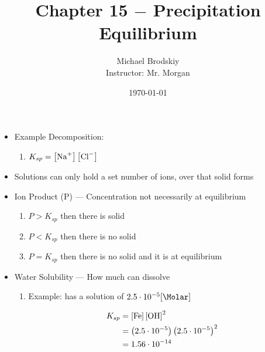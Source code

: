 \documentclass[12pt]{article}
\title{Chapter 15 $-$ Precipitation Equilibrium}
\date{\today}
\author{Michael Brodskiy\\ \small Instructor: Mr. Morgan}
\begin{document}
\maketitle

\begin{itemize}

  \item Example Decomposition: 

    \begin{enumerate}

      \item $K_{sp}=\left[ \ce{Na+} \right]\left[ \ce{Cl-} \right]$

    \end{enumerate}

  \item Solutions can only hold a set number of ions, over that solid forms

  \item Ion Product (P) — Concentration not necessarily at equilibrium

    \begin{enumerate}

      \item $P > K_{sp}$ then there is solid

      \item $P < K_{sp}$ then there is no solid

      \item $P = K_{sp}$ then there is no solid and it is at equilibrium

    \end{enumerate}

  \item Water Solubility — How much can dissolve

    \begin{enumerate}

      \item Example:  has a solution of $2.5\cdot10^{-5}[\si{\Molar}]$

        \begin{equation*}
          \begin{split}
            K_{sp}&=\left[ \ce{Fe} \right]\left[ \ce{OH} \right]^2\\
            &=\left( 2.5\cdot10^{-5} \right)\left( 2.5\cdot10^{-5} \right)^2\\
            &= 1.56\cdot10^{-14}
          \end{split}
          \label{1}
        \end{equation}


\end{equation*}
\end{enumerate}
\end{itemize}
\end{document}
